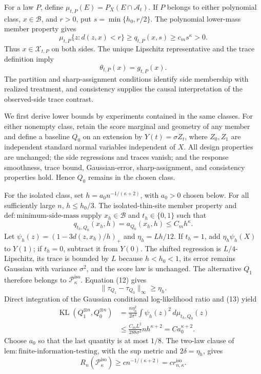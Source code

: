 For a law \(P\), define \(\mu_{t,P}(E)=P_X(E\cap\mathcal A_t)\). If \(P\) belongs to either polynomial class, \(x\in\mathcal B\), and \(r>0\), put \(s=\min\{h_0,r/2\}\). The polynomial lower-mass member property gives
\[
 \mu_{t,P}\{z:d(z,x)<r\}\ge q_{t,P}(x,s)\ge c_ms^\kappa>0. \tag{11}
\]
Thus \(x\in\mathcal X_{t,P}\) on both sides. The unique Lipschitz representative and the trace definition imply
\[
 \theta_{t,P}(x)=g_{t,P}(x). \tag{12}
\]
The partition and sharp-assignment conditions identify side membership with realized treatment, and consistency supplies the causal interpretation of the observed-side trace contrast.

We first derive lower bounds by experiments contained in the same classes. For either nonempty class, retain the score marginal and geometry of any member and define a baseline \(Q_0\) on an extension by \(Y(t)=\sigma Z_t\), where \(Z_0,Z_1\) are independent standard normal variables independent of \(X\). All design properties are unchanged; the side regressions and traces vanish; and the response smoothness, trace bound, Gaussian-error, sharp-assignment, and consistency properties hold. Hence \(Q_0\) remains in the chosen class.

For the isolated class, set \(h=a_0n^{-1/(\kappa+2)}\), with \(a_0>0\) chosen below. For all sufficiently large \(n\), \(h\le h_0/3\). The isolated-thin-site member property and \(\mathrm{def:minimum\text{-}side\text{-}mass}\) supply \(x_h\in\mathcal B\) and \(t_h\in\{0,1\}\) such that
\[
 q_{t_h,Q_0}(x_h,h)=a_{Q_0}(x_h,h)\le C_mh^\kappa. \tag{13}
\]
Let \(\psi_h(z)=(1-3d(z,x_h)/h)_+\) and \(\eta_h=Lh/12\). If \(t_h=1\), add \(\eta_h\psi_h(X)\) to \(Y(1)\); if \(t_h=0\), subtract it from \(Y(0)\). The shifted regression is \(L/4\)-Lipschitz, its trace is bounded by \(L\) because \(h<h_0<1\), its error remains Gaussian with variance \(\sigma^2\), and the score law is unchanged. The alternative \(Q_1\) therefore belongs to \(\mathcal P_\kappa^{\mathrm{iso}}\). Equation (12) gives
\[
 \|\tau_{Q_1}-\tau_{Q_0}\|_\infty\ge\eta_h. \tag{14}
\]
Direct integration of the Gaussian conditional log-likelihood ratio and (13) yield
\[
 \begin{aligned}
 \operatorname{KL}(Q_1^{\otimes n},Q_0^{\otimes n})
 &=\frac{n\eta_h^2}{2\sigma^2}\int\psi_h(z)^2\,d\mu_{t_h,Q_0}(z)\\
 &\le \frac{C_mL^2}{288\sigma^2}nh^{\kappa+2}
 =Ca_0^{\kappa+2}. 
 \end{aligned} \tag{15}
\]
Choose \(a_0\) so that the last quantity is at most \(1/8\). The two-law clause of \(\mathrm{lem:finite\text{-}information\text{-}testing}\), with the sup metric and \(2\delta=\eta_h\), gives
\[
 R_n(\mathcal P_\kappa^{\mathrm{iso}})\ge c n^{-1/(\kappa+2)}=c r_{n,\kappa}^{\mathrm{iso}}. \tag{16}
\]

